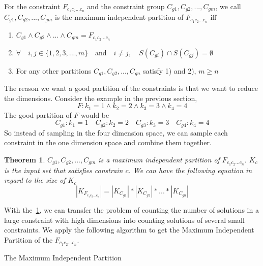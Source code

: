 \begin{definition}
      \label{Goodpartition}
      For the constraint $F_{c_1c_2...c_n}$ and the constraint group
      $C_{g1}, C_{g2}, ..., C_{gm}$, we call  $C_{g1}, C_{g2}, ..., C_{gm}$
      is the maximum independent partition of $F_{c_1c_2...c_n}$ iff
      \begin{enumerate}
            \item $C_{g1} \land C_{g2} \land ... \land C_{gm} = F_{c_1c_2...c_n}$
            \item $\forall \quad i, j \in \{1, 2, 3, ..., m\} \quad \textrm{and} \quad 
                  i \neq j, \quad S(C_{gi}) \cap S(C_{gj}) = \emptyset $
            \item For any other partitions  $C_{g1}, C_{g2}, ..., C_{gn}$ satisfy 1) and
                  2), $m \geq n$    
      \end{enumerate}
      
\end{definition}

The reason we want a good partition of the constraints is that we want to 
reduce the dimensions. Consider the example in the previous section,
$$F: {k_1} = 1\land{k_2} = 2\land{k_3} = 3\land{k_4} = 4$$
The good partition of $F$ would be
$$C_{g1}: {k_1} = 1\quad C_{g2}: {k_2} = 2\quad C_{g3}: {k_3} = 3\quad C_{g4}: {k_4} = 4$$     
So instead of sampling in the four dimension space, we can
sample each constraint in the one dimension space and combine them
together.
\newtheorem{theorem}{Theorem}[section]

\begin{theorem}
      \label{IndependentConstraint}
$C_{g1}, C_{g2}, ..., C_{gm}$ is a maximum independent partition of $F_{c_1c_2...c_n}$.
$K_c$ is the input set that satisfies constrain $c$. We can have the following
equation in regard to the size of $K_c$
$$|K_{F_{c_1c_2...c_n}}| = |K_{C_{g1}}|*|K_{C_{g2}}|*...*|K_{C_{gn}}|$$
\end{theorem}

With the~\ref{IndependentConstraint}, we can transfer the problem of counting the number of 
solutions in a large constraint with high
dimensions into counting solutions of 
several small constraints. We apply the following algorithm to get the Maximum Independent Partition
of the $F_{c_1c_2...c_n}$.

\IncMargin{1em}
\begin{algorithm}
\caption{The Maximum Independent Partition}
\end{algorithm}
\DecMargin{1em}

